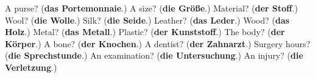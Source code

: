 \begin{tcolorbox}[breakable,colback=teal!4,colframe=teal!35!black,title={Before you move on}]
A purse? (\textbf{das Portemonnaie}.) A size? (\textbf{die Größe}.) Material? (\textbf{der Stoff}.) Wool? (\textbf{die Wolle}.) Silk? (\textbf{die Seide}.) Leather? (\textbf{das Leder}.) Wood? (\textbf{das Holz}.) Metal? (\textbf{das Metall}.) Plastic? (\textbf{der Kunststoff}.) The body? (\textbf{der Körper}.) A bone? (\textbf{der Knochen}.) A dentist? (\textbf{der Zahnarzt}.) Surgery hours? (\textbf{die Sprechstunde}.) An examination? (\textbf{die Untersuchung}.) An injury? (\textbf{die Verletzung}.)
\end{tcolorbox}
